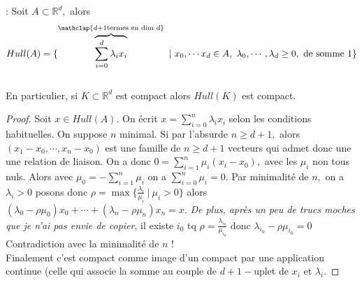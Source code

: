 \begin{remarque}  : Soit $A\subset \mathbb{R} ^d,$ alors $$Hull(A)=\{\overbrace{\sum\limits_{i=0}^{d} \lambda_ix_i}^{\mathclap{d+1 \text{termes en dim }d}}\ |\ x_0,\cdots x_d\in A, \ \lambda_0,\cdots, \lambda_d\ge 0, \text{ de somme 1}\}$$\\
    En particulier, si $K\subset \mathbb{R} ^d$ est compact alors $Hull(K)$ est compact.
\end{remarque}
\begin{proof}
    Soit $x\in Hull(A).$ On écrit $x=\sum\limits_{i=0}^{n} \lambda_ix_i$ selon les conditions habituelles.
    On suppose $n$ minimal.
    Si par l'absurde $n\ge d+1,$ alors $(x_1-x_0,\cdots, x_n-x_0)$ est une famille de $n\ge d+1$ vecteurs qui admet donc une une relation de liaison. 
    On a donc $0=\sum\limits_{i=1}^{n} \mu_i(x_i-x_0),$ avec les $\mu_i$ non tous nuls. Alors avec $\mu_0=-\sum\limits_{i=1}^{n} \mu_i$ on a $\sum\limits_{i=0}^{n} \mu_i=0$. 
    Par minimalité de $n,$  on a $\lambda _i>0$ posons donc $\rho=\max \{\frac{\lambda_i}{\mu_i}\ |\ \mu_i>0\} $ alors $(\lambda_0-\rho\mu_0)x_0+\cdots+(\lambda_n-\rho\mu_n)x_n=x$.
    \textit{De plus, après un peu de trucs moches que je n'ai pas envie de copier}, il existe $i_0$ tq $\rho=\frac{\lambda_{i_0}}{\mu_{i_0}}$ donc $\lambda_{i_0}-\rho\mu_{i_0}=0$ Contradiction avec la minimalité de $n$ !\\
    Finalement c'est compact comme image d'un compact par une application continue (celle qui associe la somme au couple de $d+1-$uplet de $x_i$ et $\lambda_i.$
\end{proof}
